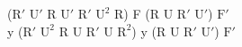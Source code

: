 ($\text{R}'$ $\text{U}'$ R $\text{U}'$ $\text{R}'$ $\text{U}^2$ R) F (R U $\text{R}'$ $\text{U}'$) $\text{F}'$\\
y ($\text{R}'$ $\text{U}^2$ R U $\text{R}'$ U $\text{R}^2$) y (R U $\text{R}'$ $\text{U}'$) $\text{F}'$\\
